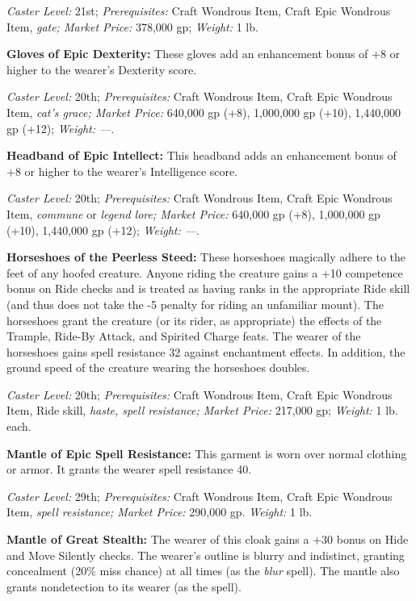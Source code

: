 \documentclass{article}
\begin{document}
\textit{Caster Level: }21st; \textit{Prerequisites: }Craft Wondrous Item, Craft 
Epic Wondrous Item, \textit{gate; Market Price: }378,000 gp; \textit{Weight: }1 
lb. 

\textbf{Gloves of Epic Dexterity: }These gloves add an enhancement bonus of +8 
or higher to the wearer's Dexterity score. 

\textit{Caster Level: }20th; \textit{Prerequisites: }Craft Wondrous Item, Craft 
Epic Wondrous Item, \textit{cat's grace; Market Price: }640,000 gp (+8), 1,000,000 
gp (+10), 1,440,000 gp (+12); \textit{Weight: ---}. 

\textbf{Headband of Epic Intellect: }This headband adds an enhancement bonus of 
+8 or higher to the wearer's Intelligence score. 

\textit{Caster Level: }20th; \textit{Prerequisites: }Craft Wondrous Item, Craft 
Epic Wondrous Item, \textit{commune }or \textit{legend lore; Market Price: }640,000 
gp (+8), 1,000,000 gp (+10), 1,440,000 gp (+12); \textit{Weight: ---}. 

\textbf{Horseshoes of the Peerless Steed: }These horseshoes magically adhere to 
the feet of any hoofed creature. Anyone riding the creature gains a +10 competence 
bonus on Ride checks and is treated as having ranks in the appropriate Ride skill 
(and thus does not take the -5 penalty for riding an unfamiliar mount). The horseshoes 
grant the creature (or its rider, as appropriate) the effects of the Trample, Ride-By 
Attack, and Spirited Charge feats. The wearer of the horseshoes gains spell resistance 
32 against enchantment effects. In addition, the ground speed of the creature wearing 
the horseshoes doubles. 

\textit{Caster Level: }20th; \textit{Prerequisites: }Craft Wondrous Item, Craft 
Epic Wondrous Item, Ride skill, \textit{haste, spell resistance; Market Price: 
}217,000 gp; \textit{Weight: }1 lb. each. 

\textbf{Mantle of Epic Spell Resistance: }This garment is worn over normal clothing 
or armor. It grants the wearer spell resistance 40. 

\textit{Caster Level: }29th; \textit{Prerequisites: }Craft Wondrous Item, Craft 
Epic Wondrous Item, \textit{spell resistance; Market Price: }290,000 gp. \textit{Weight: 
}1 lb. 

\textbf{Mantle of Great Stealth: }The wearer of this cloak gains a +30 bonus on 
Hide and Move Silently checks. The wearer's outline is blurry and indistinct, granting 
concealment (20\% miss chance) at all times (as the \textit{blur }spell). The mantle 
also grants nondetection to its wearer (as the spell). 
\end{document}
